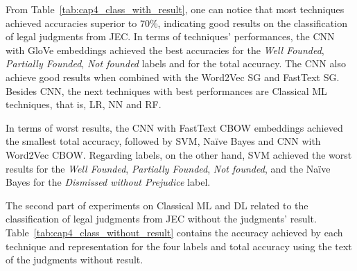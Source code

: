 From Table~\ref{tab:cap4_class_with_result}, one can notice that most techniques achieved accuracies superior to 70\%, indicating good results on the classification of legal judgments from \gls{JEC}. In terms of techniques' performances, the CNN with GloVe embeddings achieved the best accuracies for the  \emph{Well Founded}, \emph{Partially Founded},  \emph{Not founded} labels and for the total accuracy. The \gls{CNN} also achieve good results when combined with the Word2Vec \gls{SG} and FastText \gls{SG}. Besides \gls{CNN}, the next techniques with best performances are Classical \gls{ML} techniques, that is, \gls{LR}, \gls{NN} and \gls{RF}. 

In terms of worst results, the \gls{CNN} with FastText \gls{CBOW} embeddings achieved the smallest total accuracy, followed by \gls{SVM}, Naïve Bayes and \gls{CNN} with Word2Vec CBOW. Regarding labels, on the other hand,  \gls{SVM} achieved the worst results for the  \emph{Well Founded}, \emph{Partially Founded},  \emph{Not founded}, and the Naïve Bayes for the \emph{Dismissed without Prejudice} label.



The second part of experiments on Classical \gls{ML} and \gls{DL} related to the classification of legal judgments from \gls{JEC} without the judgments' result. Table~\ref{tab:cap4_class_without_result} contains the accuracy achieved by each technique and representation for the four labels and total accuracy using the text of the judgments without result. 


